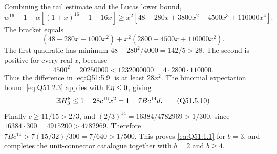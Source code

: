 Combining the tail estimate and the Lucas lower bound,
\[
w^{16}-1-\alpha[(1+x)^{16}-1-16x]
\ge x^2[48-280x+3800x^2-4500x^3+110000x^4].
\tag{Q51.5.9}\label{eq:Q51:5.9}
\]
The bracket equals
\[
(48-280x+1000x^2)+x^2(2800-4500x+110000x^2).
\]
The first quadratic has minimum
\(48-280^2/4000=\allowbreak 142/5>\allowbreak 28\).
The second is positive for every real \(x\), because
\[
4500^2=20250000<1232000000=4\cdot2800\cdot110000.
\]
Thus the difference in \eqref{eq:Q51:5.9} is at least \(28x^2\).
The binomial expectation bound \eqref{eq:Q51:2.3} applies with \(\mathbb E\eta\le\allowbreak 0\), giving
\[
\mathbb E H_3^8\le1-28c^{16}x^2=1-7Bc^{14}d.
\tag{Q51.5.10}\label{eq:Q51:5.10}
\]
Finally \(c\ge\allowbreak 11/15>\allowbreak 2/3\), and
\((2/3)^{14}=\allowbreak 16384/4782969>\allowbreak 1/300\), since
\(16384\cdot300=\allowbreak 4915200>\allowbreak 4782969\).
Therefore
\(7Bc^{14}>\allowbreak 7(15/32)/300=\allowbreak 7/640>\allowbreak 1/500\).
This proves \eqref{eq:Q51:1.1} for \(b=\allowbreak 3\), and completes the unit-connector catalogue together with \(b=\allowbreak 2\) and \(b\ge\allowbreak 4\).
